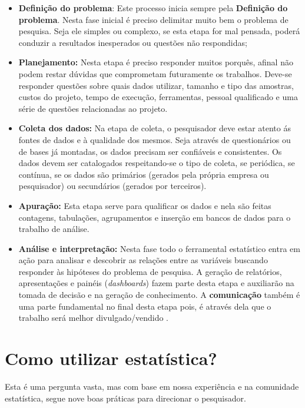 \documentclass[11pt,]{style/krantz}
\theoremstyle{definition}
\theoremstyle{definition}
\theoremstyle{definition}
\theoremstyle{remark}
\begin{document}
\begin{itemize}
\item
  \textbf{Definição do problema}: Este processo inicia sempre pela \textbf{Definição do problema}. Nesta fase inicial é preciso delimitar muito bem o problema de pesquisa. Seja ele simples ou complexo, se esta etapa for mal pensada, poderá conduzir a resultados inesperados ou questões não respondidas;
\item
  \textbf{Planejamento: } Nesta etapa é preciso responder muitos porquês, afinal não podem restar dúvidas que comprometam futuramente os trabalhos. Deve-se responder questões sobre quais dados utilizar, tamanho e tipo das amostras, custos do projeto, tempo de execução, ferramentas, pessoal qualificado e uma série de questões relacionadas ao projeto.
\item
  \textbf{Coleta dos dados: } Na etapa de coleta, o pesquisador deve estar atento ás fontes de dados e à qualidade dos mesmos. Seja através de questionários ou de bases já montadas, os dados precisam ser confiáveis e consistentes. Os dados devem ser catalogados respeitando-se o tipo de coleta, se periódica, se contínua, se os dados são primários (gerados pela própria empresa ou pesquisador) ou secundários (gerados por terceiros).
\item
  \textbf{Apuração: } Esta etapa serve para qualificar os dados e nela são feitas contagens, tabulações, agrupamentos e inserção em bancos de dados para o trabalho de análise.
\item
  \textbf{Análise e interpretação: } Nesta fase todo o ferramental estatístico entra em ação para analisar e descobrir as relações entre as variáveis buscando responder às hipóteses do problema de pesquisa. A geração de relatórios, apresentações e painéis (\emph{dashboards}) fazem parte desta etapa e auxiliarão na tomada de decisão e na geração de conhecimento. A \textbf{comunicação} também é uma parte fundamental no final desta etapa pois, é através dela que o trabalho será melhor divulgado/vendido .
\end{itemize}

\hypertarget{como-utilizar-estatistica}{%
\section{Como utilizar estatística?}\label{como-utilizar-estatistica}}

Esta é uma pergunta vasta, mas com base em nossa experiência e na comunidade estatística, segue nove boas práticas para direcionar o pesquisador.
\end{document}
